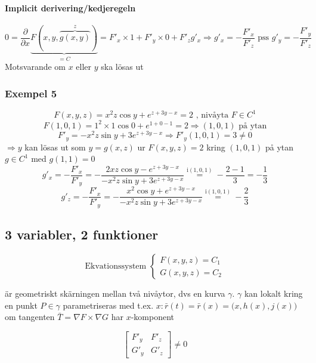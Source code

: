 \documentclass{article}
\begin{document}
\paragraph{Implicit derivering/kedjeregeln}

\[
	0 = \frac{\partial}{\partial x} \underbrace{F(x,y,\overbrace{g(x,y)}^z)}_{=C} = F'_x \times 1 + F'_y \times 0 + F'_zg'_x \Rightarrow g'_x = - \frac{F'_x}{F'_z} \text{ pss } g'_y = - \frac{F'_y}{F'_z}
\]
Motsvarande om \(x\) eller \(y\) ska lösas ut

\subsubsection{Exempel 5}
\begin{equation} \label{eq:6.7}
	F(x,y,z) = x^2z\cos{y} + e^{z + 3y - x} = 2 \text{ , nivåyta } F \in C^1
\end{equation}
\[
	F(1,0,1) = 1^2 \times 1\cos{0} + e ^{1+0-1} = 2 \Rightarrow (1,0,1) \text{ på ytan}
\]
\[
	F'_y = - x^2z\sin{y} + 3e^{z+3y-x} \Rightarrow F'_y(1,0,1) = 3 \neq 0
\]
\(\Rightarrow y\) kan lösas ut som \(y = g(x,z)\) ur \(F(x,y,z) = 2\) kring \((1,0,1)\) på ytan \(g \in C^1\) med \(g(1,1) = 0\)
\[
	g'_x = - \frac{F'_x}{F'_y} = - \frac{2xz\cos{y} - e^{z+3y-x}}{- x^2z\sin{y} + 3e^{z+3y-x}} \overset{\mathrm{i (1,0,1)}}{=} - \frac{2-1}{3} = - \frac{1}{3}
\]
\[
	g'_z = - \frac{F'_x}{F'_y} = - \frac{x^2\cos{y} + e^{z+3y-x}}{- x^2z\sin{y} + 3e^{z+3y-x}} \overset{\mathrm{i (1,0,1)}}{=} - \frac{2}{3}
\]

\subsection{3 variabler, 2 funktioner}

\[
\text{Ekvationssystem }
\left\{\begin{array}{rcl}
	F(x,y,z) = C_1 \\
	G(x,y,z) = C_2
\end{array}\right.
\]

är geometriskt skärningen mellan två nivåytor, dvs en kurva \(\gamma\). \newline
\(\gamma\) kan lokalt kring en punkt \(P \in \gamma\) parametriseras med t.ex. \(x: \bar{r}(t) = \bar{r}(x) = \Big(x,h(x),j(x)\Big)\) om tangenten \newline
\(\bar{T} = \nabla F \times \nabla G\) har \(x\)-komponent

\[\begin{bmatrix}
	F'_y & F'_z \\
	G'_y & G'_z
\end{bmatrix}\neq 0\]
\end{document}
